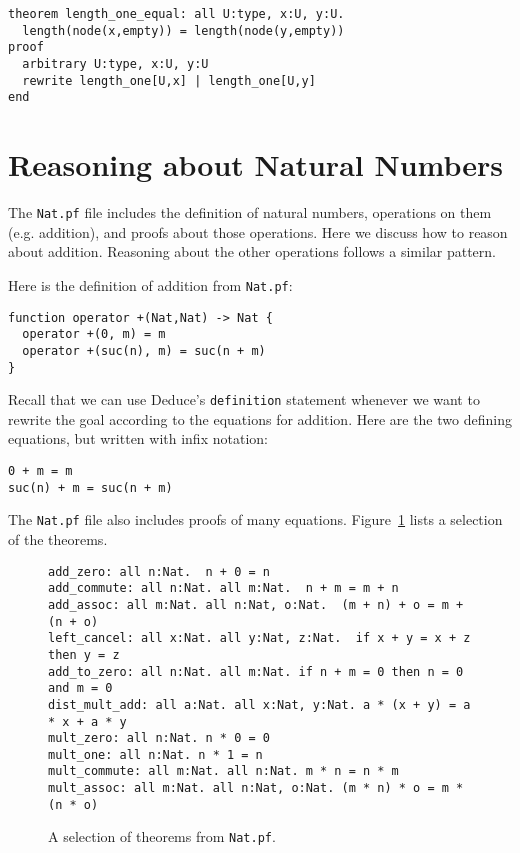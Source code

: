 \documentclass[12pt]{article}
\begin{document}
\begin{verbatim}
theorem length_one_equal: all U:type, x:U, y:U.
  length(node(x,empty)) = length(node(y,empty))
proof
  arbitrary U:type, x:U, y:U
  rewrite length_one[U,x] | length_one[U,y]
end
\end{verbatim}

\section{Reasoning about Natural Numbers}

The \texttt{Nat.pf} file includes the definition of natural numbers,
operations on them (e.g. addition), and proofs about those
operations. Here we discuss how to reason about addition. Reasoning
about the other operations follows a similar pattern.

Here is the definition of addition from \texttt{Nat.pf}:
\begin{verbatim}
function operator +(Nat,Nat) -> Nat {
  operator +(0, m) = m
  operator +(suc(n), m) = suc(n + m)
}
\end{verbatim}

Recall that we can use Deduce's \texttt{definition} statement whenever
we want to rewrite the goal according to the equations for
addition. Here are the two defining equations, but written with infix
notation:

\begin{verbatim}
0 + m = m
suc(n) + m = suc(n + m)
\end{verbatim}

The \texttt{Nat.pf} file also includes proofs of many equations.
Figure~\ref{fig:nat} lists a selection of the theorems.

\begin{figure}[btp]
{\footnotesize
\begin{verbatim}
add_zero: all n:Nat.  n + 0 = n
add_commute: all n:Nat. all m:Nat.  n + m = m + n
add_assoc: all m:Nat. all n:Nat, o:Nat.  (m + n) + o = m + (n + o)
left_cancel: all x:Nat. all y:Nat, z:Nat.  if x + y = x + z then y = z
add_to_zero: all n:Nat. all m:Nat. if n + m = 0 then n = 0 and m = 0
dist_mult_add: all a:Nat. all x:Nat, y:Nat. a * (x + y) = a * x + a * y
mult_zero: all n:Nat. n * 0 = 0
mult_one: all n:Nat. n * 1 = n
mult_commute: all m:Nat. all n:Nat. m * n = n * m
mult_assoc: all m:Nat. all n:Nat, o:Nat. (m * n) * o = m * (n * o)
\end{verbatim}
}
\caption{A selection of theorems from \texttt{Nat.pf}.}
\label{fig:nat}
\end{figure}
\end{document}
